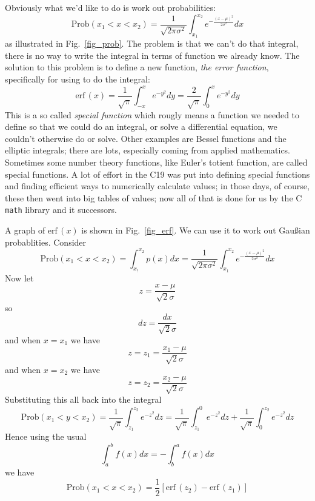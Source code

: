 \documentclass[11pt,a4paper]{scrartcl}
\begin{document}
Obviously what we'd like to do is work out probabilities:
\begin{equation}
\mbox{Prob}(x_1<x<x_2)=\frac{1}{\sqrt{2\pi\sigma^2}}\int_{x_1}^{x_2} e^{-\frac{(x-\mu)^2}{2\sigma^2}}dx
\end{equation}
as illustrated in Fig.~\ref{fig_prob}. The problem is that we can't
do that integral, there is no way to write the integral in terms of
function we already know. The solution to this problem is to define a
new function, \textsl{the error function}, specifically for using to
do the integral:
\begin{equation}
\mbox{erf}\,(x)=\frac{1}{\sqrt{\pi}}\int_{-x}^xe^{-y^2}dy=\frac{2}{\sqrt{\pi}}\int_0^xe^{-y^2}dy
\end{equation}
This is a so called \textsl{special function} which rougly means a
function we needed to define so that we could do an integral, or solve
a differential equation, we couldn't otherwise do or solve. Other
examples are Bessel functions and the elliptic integrals; there are
lots, especially coming from applied mathematics. Sometimes some
number theory functions, like Euler's totient function, are called
special functions. A lot of effort in the C19 was put into defining
special functions and finding efficient ways to numerically calculate
values; in those days, of course, these then went into big tables of
values; now all of that is done for us by the C \texttt{math} library
and it successors.

A graph of $\mbox{erf}\,(x)$ is shown in Fig.~\ref{fig_erf}. We can use it to work out Gau\ss{}ian probablities. Consider
\begin{equation}
\mbox{Prob}(x_1<x<x_2)=\int_{x_!}^{x_2} p(x)dx=\frac{1}{\sqrt{2\pi\sigma^2}}\int_{x_1}^{x_2} e^{-\frac{(x-\mu)^2}{2\sigma^2}}dx 
\end{equation}
Now let
\begin{equation}
z=\frac{x-\mu}{\sqrt{2}\sigma}
\end{equation}
so 
\begin{equation}
dz=\frac{dx}{\sqrt{2}\sigma}
\end{equation}
and when $x=x_1$ we have
\begin{equation}
z=z_1=\frac{x_1-\mu}{\sqrt{2}\sigma}
\end{equation}
and when $x=x_2$ we have
\begin{equation}
z=z_2=\frac{x_2-\mu}{\sqrt{2}\sigma}
\end{equation}
Substituting this all back into the integral
\begin{equation}
\mbox{Prob}(x_1<y<x_2)=\frac{1}{\sqrt{\pi}}\int_{z_1}^{z_2} e^{-z^2}dz=\frac{1}{\sqrt{\pi}}\int_{z_1}^{0} e^{-z^2}dz+\frac{1}{\sqrt{\pi}}\int_{0}^{z_2} e^{-z^2}dz
\end{equation}
Hence using the usual 
\begin{equation}
\int_a^bf(x)dx=-\int_b^a f(x)dx
\end{equation}
we have
\begin{equation}
\mbox{Prob}(x_1<x<x_2)=\frac{1}{2}[\mbox{erf}\,(z_2)-\mbox{erf}\,(z_1)]
\end{equation}
\end{document}
